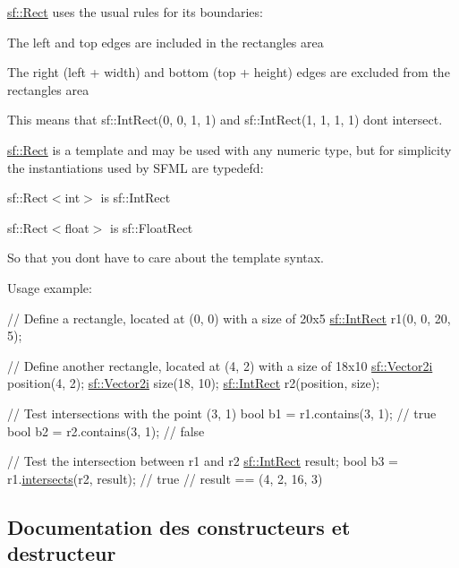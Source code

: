 \hyperlink{classsf_1_1Rect}{sf\+::\+Rect} uses the usual rules for its boundaries\+: \begin{DoxyItemize}
\item The left and top edges are included in the rectangle\textquotesingle{}s area \item The right (left + width) and bottom (top + height) edges are excluded from the rectangle\textquotesingle{}s area\end{DoxyItemize}
This means that sf\+::\+Int\+Rect(0, 0, 1, 1) and sf\+::\+Int\+Rect(1, 1, 1, 1) don\textquotesingle{}t intersect.

\hyperlink{classsf_1_1Rect}{sf\+::\+Rect} is a template and may be used with any numeric type, but for simplicity the instantiations used by S\+F\+ML are typedef\textquotesingle{}d\+: \begin{DoxyItemize}
\item sf\+::\+Rect$<$int$>$ is sf\+::\+Int\+Rect \item sf\+::\+Rect$<$float$>$ is sf\+::\+Float\+Rect\end{DoxyItemize}
So that you don\textquotesingle{}t have to care about the template syntax.

Usage example\+: 
\begin{DoxyCode}
\textcolor{comment}{// Define a rectangle, located at (0, 0) with a size of 20x5}
\hyperlink{classsf_1_1Rect}{sf::IntRect} r1(0, 0, 20, 5);

\textcolor{comment}{// Define another rectangle, located at (4, 2) with a size of 18x10}
\hyperlink{classsf_1_1Vector2}{sf::Vector2i} position(4, 2);
\hyperlink{classsf_1_1Vector2}{sf::Vector2i} size(18, 10);
\hyperlink{classsf_1_1Rect}{sf::IntRect} r2(position, size);

\textcolor{comment}{// Test intersections with the point (3, 1)}
\textcolor{keywordtype}{bool} b1 = r1.contains(3, 1); \textcolor{comment}{// true}
\textcolor{keywordtype}{bool} b2 = r2.contains(3, 1); \textcolor{comment}{// false}

\textcolor{comment}{// Test the intersection between r1 and r2}
\hyperlink{classsf_1_1Rect}{sf::IntRect} result;
\textcolor{keywordtype}{bool} b3 = r1.\hyperlink{classsf_1_1Rect_ad90321b1135cad31589f2db2f9b772db}{intersects}(r2, result); \textcolor{comment}{// true}
\textcolor{comment}{// result == (4, 2, 16, 3)}
\end{DoxyCode}
 

\subsection{Documentation des constructeurs et destructeur}
\mbox{\label{classsf_1_1Rect_a0f87ebaef9722a6222fd2e04ce8efb37}} 
